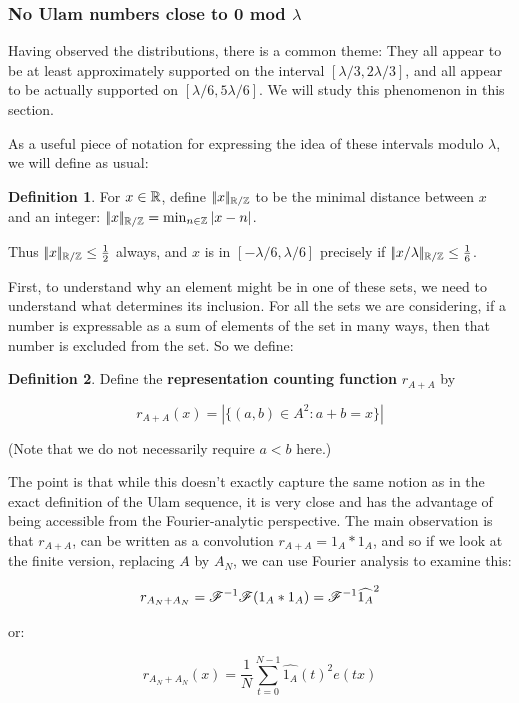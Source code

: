 \documentclass{article}
\theoremstyle{definition}
\newtheorem{definition}{Definition}
\theoremstyle{remark}
\numberwithin{equation}{section}
\begin{document}
\subsubsection{No Ulam numbers close to 0 mod $\lambda$}

Having observed the distributions, there is a common theme: They all
appear to be at least approximately supported on the interval
$[\lambda/3, 2\lambda/3]$, and all appear to be actually supported on
$[\lambda/6, 5\lambda/6]$.  We will study this phenomenon in this
section.

As a useful piece of notation for expressing the idea of these
intervals modulo $\lambda$, we will define as usual:

\begin{definition}
For $x \in \mathbb{R}$, define $|\!|x|\!|_{\mathbb{R}/\mathbb{Z}}$ to be the minimal distance between
$x$ and an integer: $|\!|x|\!|_{\mathbb{R}/\mathbb{Z}} = \min_{n \in \mathbb{Z}} |x-n|$.
\end{definition}

Thus $|\!|x|\!|_{\mathbb{R}/\mathbb{Z}} \leq \frac12$ always, and $x$ is in $[-\lambda/6,
\lambda/6]$ precisely if $|\!|x/\lambda|\!|_{\mathbb{R}/\mathbb{Z}} \leq \frac16$.

First, to understand why an element might be in one of these sets, we
need to understand what determines its inclusion.  For all the sets we
are considering, if a number is expressable as a sum of elements of
the set in many ways, then that number is excluded from the set.  So
we define: 

\begin{definition}Define the \textbf{representation counting function}
  $r_{A+A}$ by 

  \[r_{A+A}(x) = \left|\{(a,b) \in A^2 : a+b = x\}\right|\]
  

  (Note that we do not necessarily require $a < b$ here.)
\end{definition} 

The point is that while this doesn't exactly capture the same notion
as in the exact definition of the Ulam sequence, it is very close and
has the advantage of being accessible from the Fourier-analytic
perspective.  The main observation is that $r_{A+A}$, can be written
as a convolution $r_{A+A} = 1_A \ast 1_A$, and so if we look at the
finite version, replacing $A$ by $A_N$, we can use Fourier analysis to
examine this:

\[r_{A_N+A_N} = \mathscr{F}^{-1}\mathscr{F} (1_A \ast 1_A) =
\mathscr{F}^{-1} \widehat{1_A}^2\]

or:

\[r_{A_N+A_N}(x) = \frac 1N \sum_{t=0}^{N-1} \widehat{1_A}(t)^2
  e(tx)\]
\end{document}
